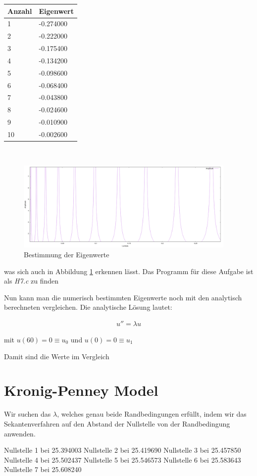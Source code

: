 \documentclass[ngerman]{scrartcl}
\begin{document}
\begin{tabular}[h]{l|l}
	Anzahl & Eigenwert \\
	\hline
	1& -0.274000\\
	2& -0.222000\\
	3& -0.175400\\
	4& -0.134200\\
	5& -0.098600\\
	6& -0.068400\\
	7& -0.043800\\
	8& -0.024600\\
	9& -0.010900\\
	10& -0.002600 \\
\end{tabular}\\

\begin{figure}[htbp]
	\centering
	\includegraphics[width=0.95\textwidth]{H7}
	\caption[Bestimmung Eigenwerte]{Bestimmung der Eigenwerte}
	\label{fig:7.1}
\end{figure}

was sich auch in Abbildung \ref{fig:7.1} erkennen lässt.
Das Programm für diese Aufgabe ist als \emph{H7.c} zu finden

Nun kann man die numerisch bestimmten Eigenwerte noch mit den analytisch berechneten vergleichen. Die analytische Lösung lautet:

\begin{align*}
	u''=\lambda u 	
\end{align*}

mit $u(60)=0 \equiv u_0$ und $u(0)=0 \equiv u_1$

Damit sind die Werte im Vergleich





\section{Kronig-Penney Model}
Wir suchen das $\lambda$, welches genau beide Randbedingungen erfüllt, indem wir das Sekantenverfahren auf den Abstand der Nullstelle von der Randbedingung anwenden.

Nullstelle 1 bei 25.394003
Nullstelle 2 bei 25.419690
Nullstelle 3 bei 25.457850
Nullstelle 4 bei 25.502437
Nullstelle 5 bei 25.546573
Nullstelle 6 bei 25.583643
Nullstelle 7 bei 25.608240
\end{document}
